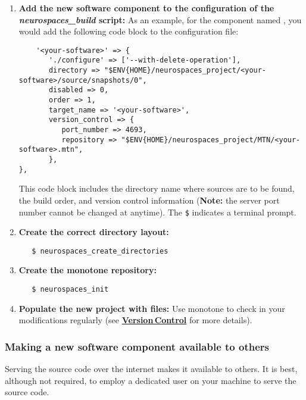 \documentclass[12pt]{article}
\begin{document}
\begin{enumerate}
\item {\bf Add the new software component to the configuration of the {\it neurospaces\_build} script:} As an example, for the component named {\tt <your-software>}, you would add the following code block to the configuration file:
\begin{verbatim}
	'<your-software>' => {
	   './configure' => ['--with-delete-operation'],
	   directory => "$ENV{HOME}/neurospaces_project/<your-software>/source/snapshots/0",
	   disabled => 0,
	   order => 1,
	   target_name => '<your-software>',
	   version_control => {
	      port_number => 4693,
	      repository => "$ENV{HOME}/neurospaces_project/MTN/<your-software>.mtn",
	   },
},
\end{verbatim}
  This code block includes the directory name where sources are to be
  found, the build order, and version control information ({\bf Note:}
  the server port number cannot be changed at anytime). The {\tt \$} indicates a terminal prompt.

\item {\bf Create the correct directory layout:}
\begin{verbatim}
   $ neurospaces_create_directories
\end{verbatim}
  
\item {\bf Create the monotone repository:}
\begin{verbatim}
   $ neurospaces_init
\end{verbatim}

\item {\bf Populate the new project with files:} Use monotone to check in your modifications regularly (see \href{../version-control/version-control.tex}{\bf Version\,Control} for more details).

\end{enumerate}

\subsubsection*{Making a new software component available to others}

Serving the source code over the internet makes it available to
others.  It is best, although not required, to employ a dedicated user on
your machine to serve the source code.
\end{document}
